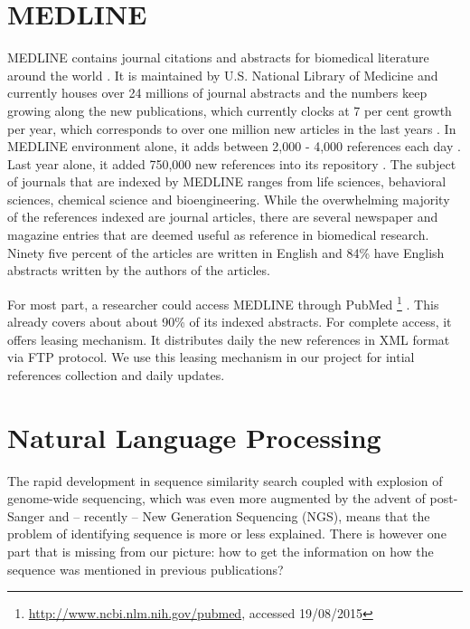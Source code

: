 
\section{MEDLINE}

MEDLINE contains journal citations and abstracts for biomedical literature around the world \citep{MEDLINE}. It is maintained by U.S. National Library of Medicine and currently houses over 24 millions of journal abstracts and the numbers keep growing along the new publications, which currently clocks at 7 per cent growth per year, which corresponds to over one million new articles in the last years \citep{larsen2010rate}. In MEDLINE environment alone, it adds between 2,000 - 4,000 references each day \citep{MEDLINE}. Last year alone, it added 750,000 new references into its repository \citep{MEDLINE}. The subject of journals that are indexed by MEDLINE ranges from life sciences, behavioral sciences, chemical science and bioengineering. While the overwhelming majority of the references indexed are journal articles, there are several newspaper and magazine entries that are deemed useful as reference in biomedical research. Ninety five percent of the articles are written in English and 84\% have English abstracts written by the authors of the articles.

For most part, a researcher could access MEDLINE through PubMed \footnote{\href{http://www.ncbi.nlm.nih.gov/pubmed}{http://www.ncbi.nlm.nih.gov/pubmed}, accessed 19/08/2015} \citep{MELDINEWeb}. This already covers about about 90\% of its indexed abstracts. For complete access, it offers leasing mechanism. It distributes daily the new references in XML format via FTP protocol. We use this leasing mechanism in our project for intial references collection and daily updates.


\section{Natural Language Processing}

The rapid development in sequence similarity search coupled with explosion of genome-wide sequencing, which was even more augmented by the advent of post-Sanger and -- recently -- New Generation Sequencing (NGS), means that the problem of identifying sequence is more or less explained. There is however one part that is missing from our picture: how to get the information on how the sequence was mentioned in previous publications?

